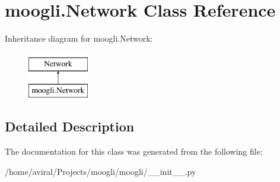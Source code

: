 \hypertarget{classmoogli_1_1Network}{\section{moogli.\-Network Class Reference}
\label{classmoogli_1_1Network}
}
Inheritance diagram for moogli.\-Network\-:\begin{figure}[H]
\begin{center}
\leavevmode
\includegraphics[height=2.000000cm]{classmoogli_1_1Network}
\end{center}
\end{figure}


\subsection{Detailed Description}


The documentation for this class was generated from the following file\-:\begin{DoxyCompactItemize}
\item 
/home/aviral/\-Projects/moogli/moogli/\-\_\-\-\_\-init\-\_\-\-\_\-.\-py\end{DoxyCompactItemize}
